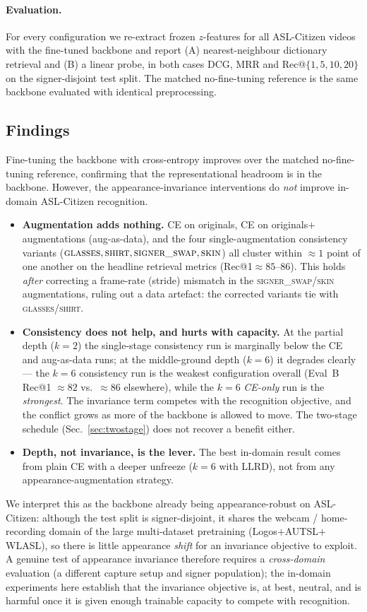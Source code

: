 \paragraph{Evaluation.}
For every configuration we re-extract frozen $z$-features for all ASL-Citizen videos with the
fine-tuned backbone and report (A) nearest-neighbour dictionary retrieval and (B) a linear
probe, in both cases DCG, MRR and Rec@$\{1,5,10,20\}$ on the signer-disjoint test split. The
matched no-fine-tuning reference is the same backbone evaluated with identical preprocessing.

\subsection{Findings}
\label{sec:backbone-ft-findings}
Fine-tuning the backbone with cross-entropy improves over the matched no-fine-tuning reference,
confirming that the representational headroom is in the backbone. However, the
appearance-invariance interventions do \emph{not} improve in-domain ASL-Citizen recognition.
\begin{itemize}
  \item \textbf{Augmentation adds nothing.} CE on originals, CE on originals${+}$augmentations
  (aug-as-data), and the four single-augmentation consistency variants
  ($\textsc{glasses},\textsc{shirt},\textsc{signer\_swap},\textsc{skin}$) all cluster within
  ${\approx}1$ point of one another on the headline retrieval metrics (Rec@1${\approx}85$--$86$).
  This holds \emph{after} correcting a frame-rate (stride) mismatch in the
  \textsc{signer\_swap}/\textsc{skin} augmentations, ruling out a data artefact: the corrected
  variants tie with \textsc{glasses}/\textsc{shirt}.
  \item \textbf{Consistency does not help, and hurts with capacity.} At the partial depth
  ($k{=}2$) the single-stage consistency run is marginally below the CE and aug-as-data runs;
  at the middle-ground depth ($k{=}6$) it degrades clearly --- the $k{=}6$ consistency run is the
  weakest configuration overall (Eval~B Rec@1 ${\approx}82$ vs.\ ${\approx}86$ elsewhere), while
  the $k{=}6$ \emph{CE-only} run is the \emph{strongest}. The invariance term competes with the
  recognition objective, and the conflict grows as more of the backbone is allowed to move. The
  two-stage schedule (Sec.~\ref{sec:twostage}) does not recover a benefit either.
  \item \textbf{Depth, not invariance, is the lever.} The best in-domain result comes from plain
  CE with a deeper unfreeze ($k{=}6$ with LLRD), not from any appearance-augmentation strategy.
\end{itemize}
We interpret this as the backbone already being appearance-robust on ASL-Citizen: although the
test split is signer-disjoint, it shares the webcam / home-recording domain of the large
multi-dataset pretraining (Logos${+}$AUTSL${+}$WLASL), so there is little appearance \emph{shift}
for an invariance objective to exploit. A genuine test of appearance invariance therefore
requires a \emph{cross-domain} evaluation (a different capture setup and signer population); the
in-domain experiments here establish that the invariance objective is, at best, neutral, and is
harmful once it is given enough trainable capacity to compete with recognition.
